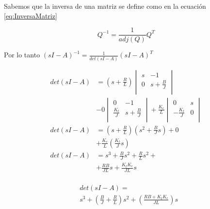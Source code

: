 Sabemos que la inversa de una matriz se define como en la ecuación \eqref{eq:InversaMatriz}

\begin{equation}
  Q^{-1} = \frac{1}{adj(Q)} Q^T
  \label{eq:InversaMatriz}
\end{equation}

Por lo tanto $(sI-A)^{-1} = \frac{1}{det(sI-A)}(sI-A)^T$ 

\begin{equation*}
  \begin{aligned}
    det(sI-A) &=
    \left(s+\frac{R}{L}\right)
    \begin{vmatrix}
      s & -1             \\
      0 &  s+\frac{B}{J} \\
    \end{vmatrix}\\
              &-
    0
    \begin{vmatrix}
      0             & -1             \\
      \frac{K_t}{J} &  s+\frac{B}{J} \\
    \end{vmatrix}
              +
    \frac{K_e}{L}
    \begin{vmatrix}
      0              & s  \\
     -\frac{K_t}{J}  & 0  \\
    \end{vmatrix}\\
    det(sI-A) &=
    \left(s+\frac{R}{L}\right)\left(s^2+\frac{B}{J}s\right) + 0 \\
    &+\frac{K_e}{L} \left(\frac{K_t}{J}s\right)\\
    det(sI-A) &=
    s^3 + \frac{B}{J}s^2 + \frac{R}{L}s^2 +\\ &+\frac{RB}{JL}s + \frac{K_t K_e}{JL}s\\
  \end{aligned}
\end{equation*}

\begin{equation}
  \begin{aligned}
    &det(sI-A) =\\
    &s^3 + \left(\frac{B}{J} + \frac{R}{L}\right)s^2 
    + \left(\frac{RB + K_t K_e}{JL}\right)s\\
  \end{aligned}
\end{equation}

